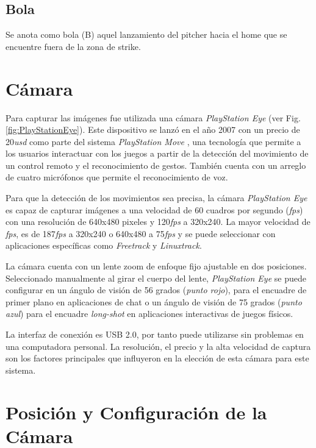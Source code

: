 \subsection{Bola}

Se anota como bola (B) aquel lanzamiento del pitcher hacia el home que se encuentre fuera de la zona de strike.

\section{Cámara}

Para capturar las imágenes fue utilizada una cámara \textit{PlayStation Eye} \cite{PlayStationEye} (ver Fig. \ref{fig:PlayStationEye}). Este dispositivo se lanzó en el año 2007 con un precio de 20\textit{usd} como parte del sistema \textit{PlayStation Move} \cite{PlayStationMove}, una tecnología que permite a los usuarios interactuar con los juegos a partir de la detección del movimiento de un control remoto y el reconocimiento de gestos. También cuenta con un arreglo de cuatro micrófonos que permite el reconocimiento de voz.

Para que la detección de los movimientos sea precisa, la cámara \textit{PlayStation Eye} es capaz de capturar imágenes a una velocidad de 60 cuadros por segundo (\textit{fps}) con una resolución de 640x480 pixeles y 120\textit{fps} a 320x240. La mayor velocidad de \textit{fps}, es de 187\textit{fps} a 320x240 o 640x480 a 75\textit{fps} y se puede seleccionar con aplicaciones específicas como \textit{Freetrack} y \textit{Linuxtrack}. 

La cámara cuenta con un lente zoom de enfoque fijo ajustable en dos posiciones. Seleccionado manualmente al girar el cuerpo del lente, \textit{PlayStation Eye} se puede configurar en un ángulo de visión de 56 grados (\textit{punto rojo}), para el encuadre de primer plano en aplicaciones de chat o un ángulo de visión de 75 grados (\textit{punto azul}) para el encuadre \textit{long-shot} en aplicaciones interactivas de juegos físicos.

La interfaz de conexión es USB 2.0, por tanto puede utilizarse sin problemas en una computadora personal. La resolución, el precio y la alta velocidad de captura son los factores principales que influyeron en la elección de esta cámara para este sistema.

\section{Posición y Configuración de la Cámara}

